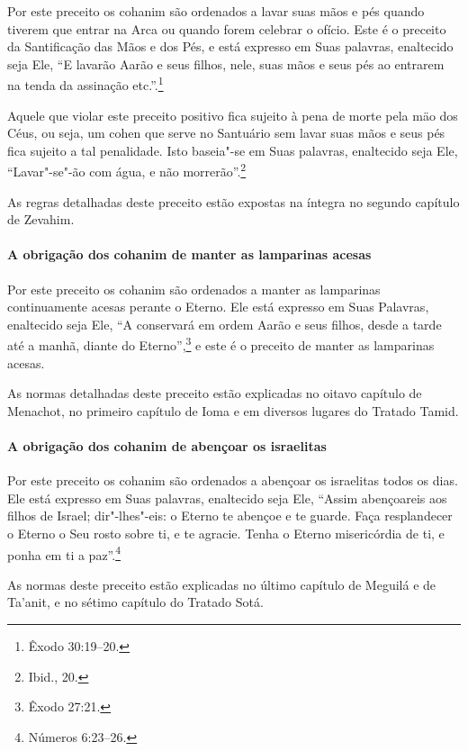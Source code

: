\begin{multicols}{2}
Por este preceito os cohanim\starr{} são ordenados a lavar suas mãos e pés
quando tiverem que entrar na Arca ou quando forem celebrar o ofício.
Este é o preceito da Santificação das Mãos e dos Pés, e está expresso em
Suas palavras, enaltecido seja Ele, ``E lavarão Aarão e seus filhos,
nele, suas mãos e seus pés ao entrarem na tenda da assinação etc.''.\footnote{Êxodo 30:19--20.}

Aquele que violar este preceito positivo fica sujeito à pena de morte
pela mäo dos Céus, ou seja, um cohen\starr{} que serve no Santuário sem
lavar suas mãos e seus pés fica sujeito a tal penalidade. Isto baseia"-se
em Suas palavras, enaltecido seja Ele, ``Lavar"-se"-ão com água, e não
morrerão''.\footnote{Ibid., 20.}

As regras detalhadas deste preceito estão expostas na íntegra no segundo
capítulo de Zevahim\starr.

\paragraph{A obrigação dos cohanim\starr{} de manter as lamparinas acesas}

Por este preceito os cohanim\starr{} são ordenados a manter as lamparinas
continuamente acesas perante o Eterno. Ele está expresso em Suas
Palavras, enaltecido seja Ele, ``A conservará em ordem Aarão e seus
filhos, desde a tarde até a manhã, diante do Eterno'',\footnote{Êxodo 27:21.} e
este é o preceito de manter as lamparinas acesas.

As normas detalhadas deste preceito estão explicadas no oitavo capítulo
de Menachot\starr, no primeiro capítulo de Ioma\starr{} e em diversos lugares do
Tratado Tamid\starr.

\paragraph{A obrigação dos cohanim\starr{} de abençoar os israelitas}

Por este preceito os cohanim\starr{} são ordenados a abençoar os israelitas
todos os dias. Ele está expresso em Suas palavras, enaltecido seja Ele,
``Assim abençoareis aos filhos de Israel; dir"-lhes"-eis: o Eterno te
abençoe e te guarde. Faça resplandecer o Eterno o Seu rosto sobre ti, e
te agracie. Tenha o Eterno misericórdia de ti, e ponha em ti a paz''.\footnote{Números 6:23--26.}

As normas deste preceito estão explicadas no último capítulo de Meguilá\starr{}
e de Ta'anit\starr, e no sétimo capítulo do Tratado Sotá\starr.


\end{multicols}
